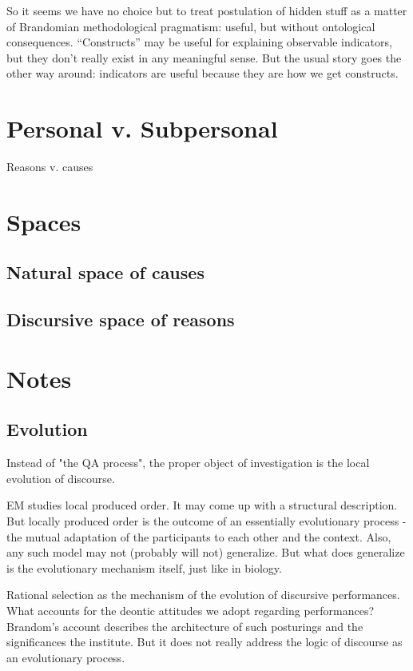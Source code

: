 \documentclass[11pt,twoside]{article}
\begin{document}
So it seems we have no choice but to treat postulation of hidden stuff
as a matter of Brandomian methodological pragmatism: useful, but
without ontological consequences.  ``Constructs'' may be useful for
explaining observable indicators, but they don't really exist in any
meaningful sense.  But the usual story goes the other way around:
indicators are useful because they are how we get constructs.

\section{Personal v. Subpersonal}

Reasons v. causes

\section{Spaces}

\subsection{Natural space of causes}

\subsection{Discursive space of reasons}

\section{Notes}

\subsection{Evolution}

Instead of "the QA process", the proper object of investigation is the
local evolution of discourse.

EM studies local produced order.  It may come up with a structural
description.  But locally produced order is the outcome of an
essentially evolutionary process - the mutual adaptation of the
participants to each other and the context.  Also, any such model may
not (probably will not) generalize.  But what does generalize is the
evolutionary mechanism itself, just like in biology.

Rational selection as the mechanism of the evolution of discursive
performances.  What accounts for the deontic attitudes we adopt
regarding performances?  Brandom's account describes the architecture
of such posturings and the significances the institute.  But it does
not really address the logic of discourse as an evolutionary process.
\end{document}
